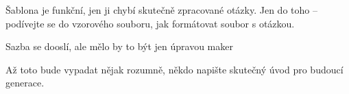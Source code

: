 Šablona je funkční, jen ji chybí skutečně zpracované otázky. Jen do toho -- podívejte se do vzorového souboru, jak formátovat soubor s otázkou.

Sazba se dooslí, ale mělo by to být jen úpravou maker

Až toto bude vypadat nějak rozumně, někdo napište skutečný úvod pro budoucí generace.
